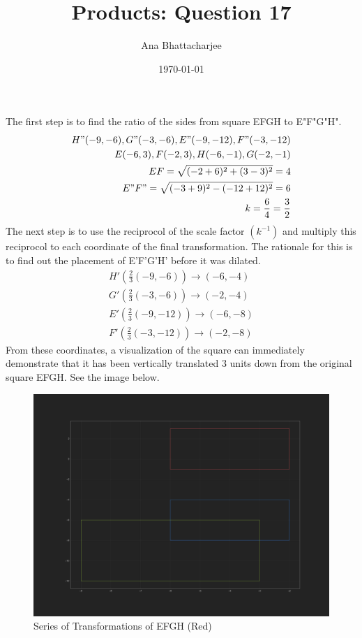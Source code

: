 \documentclass{article}
\begin{document}
\title{Products: Question 17}
\author{Ana Bhattacharjee}
\date{\today}
\maketitle{}

\begin{center}
The first step is to find the ratio of the sides from square EFGH to E"F"G"H".
\begin{align}
H" (-9, -6), G" (-3, -6), E" (-9, -12), F" (-3, -12) \\
E (-6, 3), F (-2, 3), H (-6, -1), G (-2, -1) \\
EF = \sqrt{(-2 + 6)^2 + (3 - 3)^2} = 4 \\
E"F" = \sqrt{(-3 + 9)^2 - (-12 + 12)^2} = 6 \\
k = \frac{6}{4} = \frac{3}{2} \\
\end{align}
The next step is to use the reciprocol of the scale factor $(k^{-1})$ and multiply this reciprocol to each coordinate of the final transformation. The rationale for this is to find out the placement of E'F'G'H' before it was dilated.
\begin{align}
H' (\frac{2}{3}(-9, -6)) \rightarrow (-6, -4) \\
G' (\frac{2}{3}(-3, -6)) \rightarrow (-2, -4 ) \\
E' (\frac{2}{3}(-9, -12)) \rightarrow (-6, -8) \\
F' (\frac{2}{3}(-3, -12)) \rightarrow (-2, -8)
\end{align}
From these coordinates, a visualization of the square can immediately demonstrate that it has been vertically translated 3 units down from the original square EFGH. See the image below.
\begin{figure}[!htbp]
  \includegraphics[width=1.0\columnwidth]{../q_17}
  \caption{Series of Transformations of EFGH (Red)}
\end{figure}
\end{center}
\end{document}

